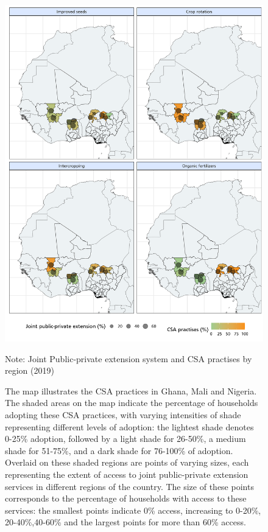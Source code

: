 \documentclass[
]{article}
\begin{document}
\begin{figure}[H]
\centering
\includegraphics[scale=0.6]{"figures/map_joint.png"}
\caption{Note: Joint Public-private extension system and CSA practises  by region (2019)}
\caption*{The map illustrates the CSA practices in Ghana, Mali and Nigeria. The shaded areas on the map indicate the percentage of households adopting these CSA practices, with varying intensities of shade representing different levels of adoption: the lightest shade denotes 0-25\% adoption, followed by a light shade for 26-50\%, a medium shade for 51-75\%, and a dark shade for 76-100\% of adoption. Overlaid on these shaded regions are points of varying sizes, each representing the extent of access to joint public-private extension services in different regions of the country. The size of these points corresponds to the percentage of households with access to these services: the smallest points indicate 0\% access, increasing to 0-20\%, 20-40\%,40-60\% and the largest points for more than 60\% access.}
\label{fig:map_1}
\end{figure}
\end{document}
